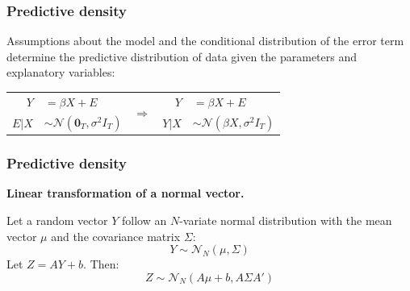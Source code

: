 \documentclass[notes,blackandwhite,mathsans]{beamer}
\begin{document}
\begin{frame}
\frametitle{Predictive density}

{\color{mcxs3}\small Assumptions about the model and the conditional distribution of the error term determine the {\color{mcxs2}predictive distribution of data} given the parameters and explanatory variables:}

\begin{center}
\begin{tabular}{rlcrl}
$Y$ &$= \beta X + E$ &\multirow{2}{*}{$\Rightarrow$}& $Y$ &$= \beta X + E$\\
$E|X$ &$\sim\mathcal{N}\left(\mathbf{0}_T, \sigma^2I_T\right)$ && $Y|X$ &$\sim\mathcal{N}\left(\beta X, \sigma^2I_T\right)$
\end{tabular}
\end{center}

\end{frame}





\begin{frame}
\frametitle{Predictive density}

\textbf{Linear transformation of a normal vector.}

\small
{\color{mcxs3} Let a random vector} $Y$ {\color{mcxs3}follow an $N$-variate normal distribution with the mean vector} $\mu$ {\color{mcxs3}and the covariance matrix} $\Sigma$:
$$ Y\sim\mathcal{N}_N\left( \mu, \Sigma \right) $$
{\color{mcxs3}Let} $Z = AY + b$. {\color{mcxs3}Then:}
$$ Z\sim\mathcal{N}_N\left( A\mu + b, A\Sigma A' \right) $$
\end{frame}
\end{document}
